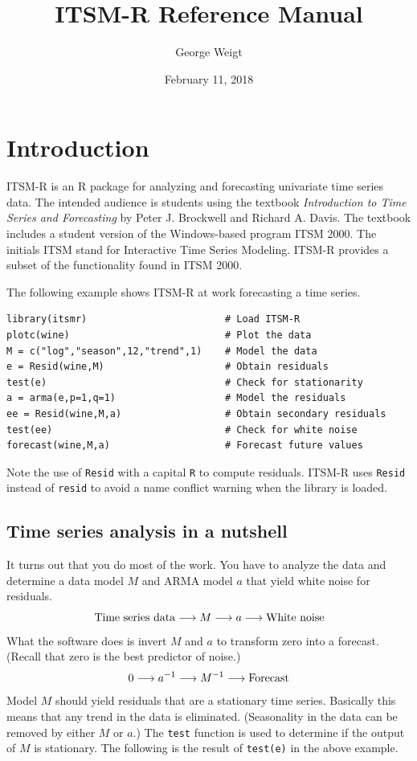 \documentclass[11pt]{article}
\title{ITSM-R Reference Manual}
\author{George Weigt}
\date{February 11, 2018}
\begin{document}
\maketitle


\newpage

\tableofcontents

\newpage

\section{Introduction}
ITSM-R is an R package for analyzing and forecasting univariate
time series data.
The intended audience is students using the textbook
{\it Introduction to Time Series and Forecasting}
by Peter J. Brockwell and Richard A. Davis.
The textbook includes a student version of the Windows-based program ITSM 2000.
The initials ITSM stand for Interactive Time Series Modeling.
ITSM-R provides a subset of the functionality found in ITSM 2000.

The following example shows ITSM-R at work forecasting a time series.

\begin{Verbatim}
library(itsmr)                        # Load ITSM-R
plotc(wine)                           # Plot the data
M = c("log","season",12,"trend",1)    # Model the data
e = Resid(wine,M)                     # Obtain residuals
test(e)                               # Check for stationarity
a = arma(e,p=1,q=1)                   # Model the residuals
ee = Resid(wine,M,a)                  # Obtain secondary residuals
test(ee)                              # Check for white noise
forecast(wine,M,a)                    # Forecast future values
\end{Verbatim}

Note the use of {\tt Resid} with a capital {\tt R} to compute residuals.
ITSM-R uses {\tt Resid} instead of {\tt resid} to avoid a name conflict
warning when the library is loaded.

\subsection{Time series analysis in a nutshell}
It turns out that you do most of the work.
You have to analyze the data and
determine a data model $M$ and ARMA model $a$
that yield white noise for residuals.
\[
\hbox{Time series data}
\longrightarrow M\longrightarrow a\longrightarrow
\hbox{White noise}
\]
What the software does is invert $M$ and $a$ to transform zero into a forecast.
(Recall that zero is the best predictor of noise.)
\[
0\longrightarrow a^{-1}\longrightarrow M^{-1}\longrightarrow{\rm Forecast}
\]
Model $M$ should yield residuals that are a stationary time series.
Basically this means that any trend in the data is eliminated.
(Seasonality in the data can be removed by either $M$ or $a$.)
The {\tt test} function is used to determine if the output of $M$ is stationary.
The following is the result of {\tt test(e)} in the above example.
\end{document}
